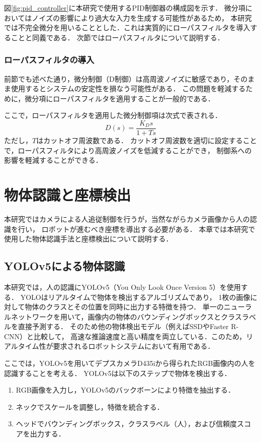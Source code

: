 図\ref{fig:pid_controller}に本研究で使用するPID制御器の構成図を示す．
微分項においてはノイズの影響により過大な入力を生成する可能性があるため，
本研究では不完全微分を用いることとした．これは実質的にローパスフィルタを導入することと同義である．
次節ではローパスフィルタについて説明する．


\subsubsection{ローパスフィルタの導入}
前節でも述べた通り，微分制御（D制御）は高周波ノイズに敏感であり，そのまま使用するとシステムの安定性を損なう可能性がある．
この問題を軽減するために，微分項にローパスフィルタを適用することが一般的である．

ここで，ローパスフィルタを適用した微分制御項は次式で表される．
\begin{equation}
    D(s) = \frac{K_D s}{1 + T s}
    \label{eq:lowpass_filter}
\end{equation}
ただし，$T$はカットオフ周波数である．
カットオフ周波数を適切に設定することで，ローパスフィルタにより高周波ノイズを低減することができ，
制御系への影響を軽減することができる．

\section{物体認識と座標検出}
本研究ではカメラによる人追従制御を行うが，当然ながらカメラ画像から人の認識を行い，
ロボットが進むべき座標を導出する必要がある．
本章では本研究で使用した物体認識手法と座標検出について説明する．

\subsection{YOLOv5による物体認識}
本研究では，人の認識にYOLOv5（You Only Look Once Version 5）を使用する．
YOLOはリアルタイムで物体を検出するアルゴリズムであり，
1枚の画像に対して物体のクラスとその位置を同時に出力する特徴を持つ．
単一のニューラルネットワークを用いて，画像内の物体のバウンディングボックスとクラスラベルを直接予測する\cite{yolo}．
そのため他の物体検出モデル（例えばSSDやFaster R-CNN）と比較して，
高速な推論速度と高い精度を両立している．このため，リアルタイム性が要求されるロボットシステムにおいて有用である．

ここでは，YOLOv5を用いてデプスカメラD435iから得られたRGB画像内の人を認識することを考える．
YOLOv5は以下のステップで物体を検出する．
\begin{enumerate}
    \item RGB画像を入力し，YOLOv5のバックボーンにより特徴を抽出する．
    \item ネックでスケールを調整し，特徴を統合する．
    \item ヘッドでバウンディングボックス，クラスラベル（人），および信頼度スコアを出力する．
\end{enumerate}

